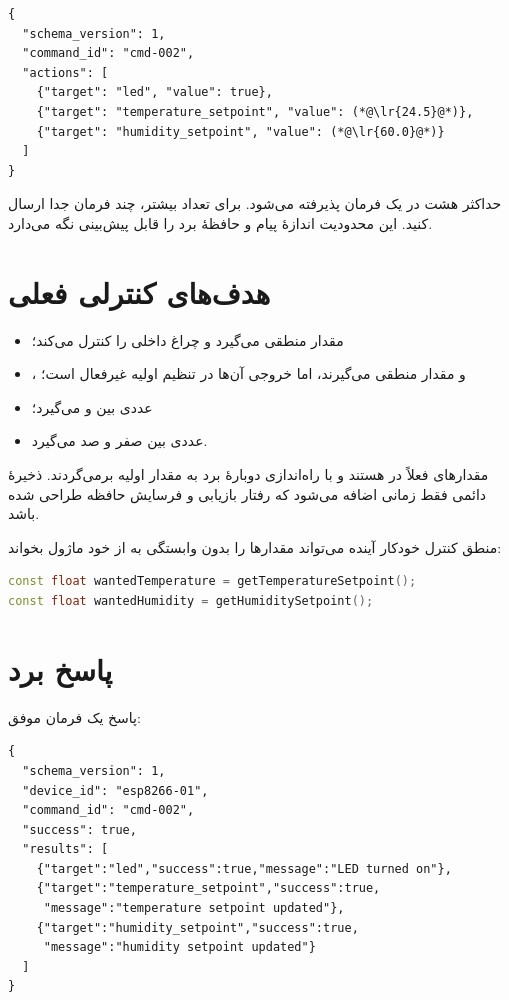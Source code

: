 \begin{LTR}
\begin{lstlisting}
{
  "schema_version": 1,
  "command_id": "cmd-002",
  "actions": [
    {"target": "led", "value": true},
    {"target": "temperature_setpoint", "value": (*@\lr{24.5}@*)},
    {"target": "humidity_setpoint", "value": (*@\lr{60.0}@*)}
  ]
}
\end{lstlisting}
\end{LTR}

حداکثر هشت
در یک فرمان پذیرفته می‌شود. برای تعداد بیشتر، چند فرمان جدا ارسال کنید. این محدودیت اندازهٔ پیام و حافظهٔ برد را قابل پیش‌بینی نگه می‌دارد.

\section{هدف‌های کنترلی فعلی}
\begin{itemize}
  \item
  مقدار منطقی می‌گیرد و چراغ داخلی را کنترل می‌کند؛
  \item
  ،
  و
  مقدار منطقی می‌گیرند، اما خروجی آن‌ها در تنظیم اولیه غیرفعال است؛
  \item
  عددی بین
  و
  می‌گیرد؛
  \item
  عددی بین صفر و صد می‌گیرد.
\end{itemize}

مقدارهای
فعلاً در
هستند و با راه‌اندازی دوبارهٔ برد به مقدار اولیه برمی‌گردند. ذخیرهٔ دائمی فقط زمانی اضافه می‌شود که رفتار بازیابی و فرسایش حافظه طراحی شده باشد.

منطق کنترل خودکار آینده می‌تواند مقدارها را بدون وابستگی به
از خود ماژول بخواند:

\begin{LTR}
\begin{lstlisting}[language=C++]
const float wantedTemperature = getTemperatureSetpoint();
const float wantedHumidity = getHumiditySetpoint();
\end{lstlisting}
\end{LTR}

\section{پاسخ برد}
پاسخ یک فرمان موفق:

\begin{LTR}
\begin{lstlisting}
{
  "schema_version": 1,
  "device_id": "esp8266-01",
  "command_id": "cmd-002",
  "success": true,
  "results": [
    {"target":"led","success":true,"message":"LED turned on"},
    {"target":"temperature_setpoint","success":true,
     "message":"temperature setpoint updated"},
    {"target":"humidity_setpoint","success":true,
     "message":"humidity setpoint updated"}
  ]
}
\end{lstlisting}
\end{LTR}

